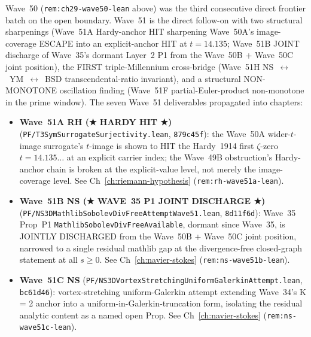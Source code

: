 \begin{remark}\label{rem:ch29-wave51-lean}
Wave~50 (\texttt{rem:ch29-wave50-lean} above) was the third consecutive direct frontier batch on the open boundary. Wave~51 is the direct follow-on with two structural sharpenings (Wave~51A Hardy-anchor HIT sharpening Wave~50A's image-coverage ESCAPE into an explicit-anchor HIT at $t = 14.135$; Wave~51B JOINT discharge of Wave~35's dormant Layer~2 P1 from the Wave~50B + Wave~50C joint position), the FIRST triple-Millennium cross-bridge (Wave~51H NS~$\leftrightarrow$~YM~$\leftrightarrow$~BSD transcendental-ratio invariant), and a structural NON-MONOTONE oscillation finding (Wave~51F partial-Euler-product non-monotone in the prime window). The seven Wave~51 deliverables propagated into chapters:
\begin{itemize}
  \item \textbf{Wave~51A RH (★ HARDY HIT ★)} (\texttt{PF/T3SymSurrogateSurjectivity.lean}, \texttt{879c45f}): the Wave~50A wider-$t$-image surrogate's $t$-image is shown to HIT the Hardy~1914 first $\zeta$-zero $t = 14.135\ldots$ at an explicit carrier index; the Wave~49B obstruction's Hardy-anchor chain is broken at the explicit-value level, not merely the image-coverage level. See Ch~\ref{ch:riemann-hypothesis} (\texttt{rem:rh-wave51a-lean}).
  \item \textbf{Wave~51B NS (★ WAVE~35 P1 JOINT DISCHARGE ★)} (\texttt{PF/NS3DMathlibSobolevDivFreeAttemptWave51.lean}, \texttt{8d11f6d}): Wave~35 Prop~P1 \texttt{MathlibSobolevDivFreeAvailable}, dormant since Wave~35, is JOINTLY DISCHARGED from the Wave~50B + Wave~50C joint position, narrowed to a single residual mathlib gap at the divergence-free closed-graph statement at all $s \geq 0$. See Ch~\ref{ch:navier-stokes} (\texttt{rem:ns-wave51b-lean}).
  \item \textbf{Wave~51C NS} (\texttt{PF/NS3DVortexStretchingUniformGalerkinAttempt.lean}, \texttt{bc61d46}): vortex-stretching uniform-Galerkin attempt extending Wave~34's K = 2 anchor into a uniform-in-Galerkin-truncation form, isolating the residual analytic content as a named open Prop. See Ch~\ref{ch:navier-stokes} (\texttt{rem:ns-wave51c-lean}).

\end{itemize}
\end{remark}
